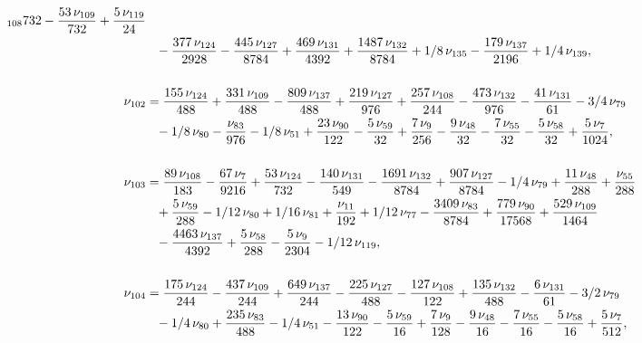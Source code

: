 \documentclass[a4paper,12pt, DIV=14, BCOR=5mm, twoside, headsepline]{scrbook}
\begin{document}
\begin{align}
\begin{aligned}
{{_{{108}}}{732}}-{\frac {53\,\nu_{{109}}}{732}}+{\frac {5\,\nu_{{119}}
}{24}}\\
 &\hphantom{=}-{\frac {377\,\nu_{{124}}}{2928}}-{\frac {445\,\nu_{{127}}}{8784
}}+{\frac {469\,\nu_{{131}}}{4392}}+{\frac {1487\,\nu_{{132}}}{8784}}+
1/8\,\nu_{{135}}-{\frac {179\,\nu_{{137}}}{2196}}+1/4\,\nu_{{139}}, \\
\\
\nu
_{{102}}&={\frac {155\,\nu_{{124}}}{488}}+{\frac {331\,\nu_{{109}}}{488
}}-{\frac {809\,\nu_{{137}}}{488}}+{\frac {219\,\nu_{{127}}}{976}}+{
\frac {257\,\nu_{{108}}}{244}}-{\frac {473\,\nu_{{132}}}{976}}-{\frac 
{41\,\nu_{{131}}}{61}}-3/4\,\nu_{{79}}\\
 &\hphantom{=}-1/8\,\nu_{{80}}-{\frac {\nu_{{
83}}}{976}}-1/8\,\nu_{{51}}+{\frac {23\,\nu_{{90}}}{122}}-{\frac {5\,
\nu_{{59}}}{32}}+{\frac {7\,\nu_{{9}}}{256}}-{\frac {9\,\nu_{{48}}}{32
}}-{\frac {7\,\nu_{{55}}}{32}}-{\frac {5\,\nu_{{58}}}{32}}+{\frac {5\,
\nu_{{7}}}{1024}}, \\
\\
\nu_{{103}}&={\frac {89\,\nu_{{108}}}{183}}-{\frac {
67\,\nu_{{7}}}{9216}}+{\frac {53\,\nu_{{124}}}{732}}-{\frac {140\,\nu_
{{131}}}{549}}-{\frac {1691\,\nu_{{132}}}{8784}}+{\frac {907\,\nu_{{
127}}}{8784}}-1/4\,\nu_{{79}}+{\frac {11\,\nu_{{48}}}{288}}+{\frac {
\nu_{{55}}}{288}}\\
 &\hphantom{=}+{\frac {5\,\nu_{{59}}}{288}}-1/12\,\nu_{{80}}+1/16\,
\nu_{{81}}+{\frac {\nu_{{11}}}{192}}+1/12\,\nu_{{77}}-{\frac {3409\,
\nu_{{83}}}{8784}}+{\frac {779\,\nu_{{90}}}{17568}}+{\frac {529\,\nu_{
{109}}}{1464}}\\
 &\hphantom{=}-{\frac {4463\,\nu_{{137}}}{4392}}+{\frac {5\,\nu_{{58}}
}{288}}-{\frac {5\,\nu_{{9}}}{2304}}-1/12\,\nu_{{119}}, \\
\\
\nu_{{104}}&={
\frac {175\,\nu_{{124}}}{244}}-{\frac {437\,\nu_{{109}}}{244}}+{\frac 
{649\,\nu_{{137}}}{244}}-{\frac {225\,\nu_{{127}}}{488}}-{\frac {127\,
\nu_{{108}}}{122}}+{\frac {135\,\nu_{{132}}}{488}}-{\frac {6\,\nu_{{
131}}}{61}}-3/2\,\nu_{{79}}\\
 &\hphantom{=}-1/4\,\nu_{{80}}+{\frac {235\,\nu_{{83}}}{
488}}-1/4\,\nu_{{51}}-{\frac {13\,\nu_{{90}}}{122}}-{\frac {5\,\nu_{{
59}}}{16}}+{\frac {7\,\nu_{{9}}}{128}}-{\frac {9\,\nu_{{48}}}{16}}-{
\frac {7\,\nu_{{55}}}{16}}-{\frac {5\,\nu_{{58}}}{16}}+{\frac {5\,\nu_
{{7}}}{512}}, 
\end{aligned}
\end{align}
\end{document}
